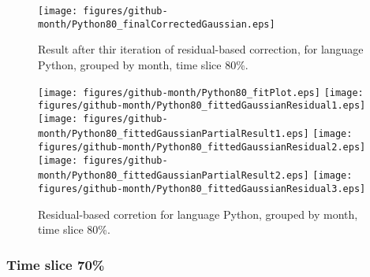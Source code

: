 \begin{figure}[]
\centering
{\texttt{[image: figures/github-month/Python80\_finalCorrectedGaussian.eps]}}
\caption{Result after thir iteration of residual-based correction, for language Python, grouped by month, time slice 80\%.}
\end{figure}


\begin{figure}[hb]
\centering
{}
{\texttt{[image: figures/github-month/Python80\_fitPlot.eps]}}
{\texttt{[image: figures/github-month/Python80\_fittedGaussianResidual1.eps]}}
{\texttt{[image: figures/github-month/Python80\_fittedGaussianPartialResult1.eps]}}
{\texttt{[image: figures/github-month/Python80\_fittedGaussianResidual2.eps]}}
{\texttt{[image: figures/github-month/Python80\_fittedGaussianPartialResult2.eps]}}
{\texttt{[image: figures/github-month/Python80\_fittedGaussianResidual3.eps]}}
\caption{Residual-based corretion for language Python, grouped by month, time slice 80\%.}
\end{figure}


\clearpage 
\newpage 


\FloatBarrier

\subsubsection{Time slice 70\%}

